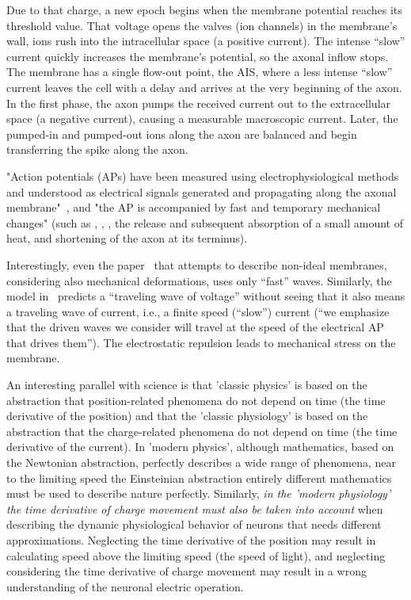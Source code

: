 Due to that charge, a new epoch begins when the membrane potential reaches its threshold value. That voltage opens the valves (ion channels)
in the membrane's wall, ions rush into the intracellular space
(a positive current). The intense ``slow'' current quickly increases
the membrane's potential, so the axonal inflow stops. The membrane
has a single flow-out point, the 
\gls{AIS},
where a less intense ``slow''
current leaves the cell with a delay and arrives at the very beginning
of the axon. In the first phase, the axon pumps the received current
out to the extracellular space (a negative current), causing a measurable
macroscopic current. Later, the pumped-in and pumped-out ions along
the axon are balanced and begin transferring the spike along the
axon. 


"Action potentials (APs) have been measured using electrophysiological
methods and understood as electrical signals generated and propagating
along the axonal membrane"~\cite{MechanicalWaves:2015}, and "the
\gls{AP} is accompanied by fast and temporary mechanical changes" (such
as , , ,
the release and subsequent
absorption of a small amount of heat, and shortening of the axon at
its terminus).

Interestingly, even the paper~\cite{ElectrochemistryMembrane:2022}
that attempts to describe non-ideal membranes, considering also mechanical
deformations, uses only ``fast'' waves. Similarly, the model in~\cite{MechanicalWaves:2015}
predicts a ``traveling wave of voltage'' without seeing that it
also means a traveling wave of current, i.e., a finite speed (``slow'')
current (``we emphasize that the driven waves we consider will travel
at the speed of the electrical \gls{AP}
that drives them''). The
electrostatic repulsion leads to mechanical stress on the membrane.

An interesting parallel with science is that 'classic physics' 
is based on the abstraction that position-related phenomena do not depend on time
(the time derivative of the position)
and that the 'classic physiology' is based on the abstraction that the charge-related
phenomena do not depend on time (the time derivative of the current).
In 'modern physics', although mathematics, based on the Newtonian abstraction, perfectly describes a wide range of phenomena, near to the limiting speed the Einsteinian abstraction
entirely different mathematics must be used to describe nature perfectly.
Similarly, \textit{in the 'modern physiology' the time derivative of charge movement 
must also be taken into account} when describing the dynamic physiological 
behavior of neurons that needs different approximations.
Neglecting the time derivative of the position may result in
calculating speed above the limiting speed (the speed of light),
and neglecting considering the time derivative of charge movement may result 
in a wrong understanding of the neuronal electric operation.



